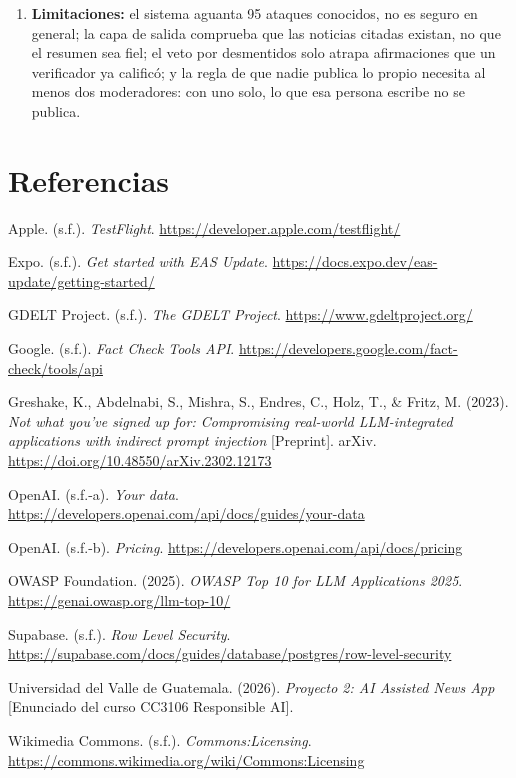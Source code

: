 \documentclass[12pt,a4paper]{article}
\newenvironment{referencias}
  {\begin{list}{}{%
     \setlength{\leftmargin}{1.6em}\setlength{\itemindent}{-1.6em}%
     \setlength{\labelwidth}{0pt}\setlength{\labelsep}{0pt}%
     \setlength{\itemsep}{0.7em}\setlength{\parsep}{0pt}}}
  {\end{list}}
\begin{document}
\begin{enumerate}[leftmargin=1.4em]
\item \textbf{Limitaciones:} el sistema aguanta 95 ataques conocidos, no es seguro en general; la
capa de salida comprueba que las noticias citadas existan, no que el resumen sea fiel; el veto por
desmentidos solo atrapa afirmaciones que un verificador ya calificó; y la regla de que nadie publica
lo propio necesita al menos dos moderadores: con uno solo, lo que esa persona escribe no se publica.
\end{enumerate}

\section{Referencias}

\begin{referencias}

\item Apple. (s.f.). \emph{TestFlight}. \url{https://developer.apple.com/testflight/}

\item Expo. (s.f.). \emph{Get started with EAS Update}.
\url{https://docs.expo.dev/eas-update/getting-started/}

\item GDELT Project. (s.f.). \emph{The GDELT Project}. \url{https://www.gdeltproject.org/}

\item Google. (s.f.). \emph{Fact Check Tools API}.
\url{https://developers.google.com/fact-check/tools/api}

\item Greshake, K., Abdelnabi, S., Mishra, S., Endres, C., Holz, T., \& Fritz, M. (2023). \emph{Not
what you've signed up for: Compromising real-world LLM-integrated applications with indirect prompt
injection} [Preprint]. arXiv. \url{https://doi.org/10.48550/arXiv.2302.12173}

\item OpenAI. (s.f.-a). \emph{Your data}. \url{https://developers.openai.com/api/docs/guides/your-data}

\item OpenAI. (s.f.-b). \emph{Pricing}. \url{https://developers.openai.com/api/docs/pricing}

\item OWASP Foundation. (2025). \emph{OWASP Top 10 for LLM Applications 2025}.
\url{https://genai.owasp.org/llm-top-10/}

\item Supabase. (s.f.). \emph{Row Level Security}.
\url{https://supabase.com/docs/guides/database/postgres/row-level-security}

\item Universidad del Valle de Guatemala. (2026). \emph{Proyecto 2: AI Assisted News App}
[Enunciado del curso CC3106 Responsible AI].

\item Wikimedia Commons. (s.f.). \emph{Commons:Licensing}.
\url{https://commons.wikimedia.org/wiki/Commons:Licensing}

\end{referencias}
\end{document}
